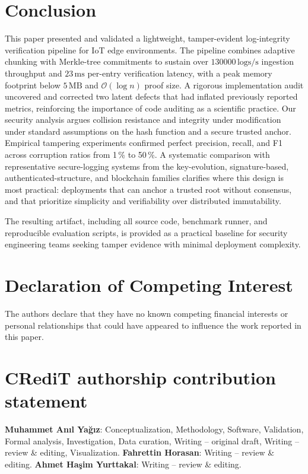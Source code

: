 \documentclass[preprint,12pt]{elsarticle}
\begin{document}
\section{Conclusion}
\label{sec:conclusion}

This paper presented and validated a lightweight, tamper-evident log-integrity verification pipeline for IoT edge environments.
The pipeline combines adaptive chunking with Merkle-tree commitments to sustain over $130000\,\mathrm{logs/s}$ ingestion throughput and $23\,\mathrm{ms}$ per-entry verification latency, with a peak memory footprint below $5\,\mathrm{MB}$ and $\mathcal{O}(\log n)$ proof size.
A rigorous implementation audit uncovered and corrected two latent defects that had inflated previously reported metrics, reinforcing the importance of code auditing as a scientific practice.
Our security analysis argues collision resistance and integrity under modification under standard assumptions on the hash function and a secure trusted anchor.
Empirical tampering experiments confirmed perfect precision, recall, and F1 across corruption ratios from 1\,\% to 50\,\%.
A systematic comparison with representative secure-logging systems from the key-evolution, signature-based, authenticated-structure, and blockchain families clarifies where this design is most practical: deployments that can anchor a trusted root without consensus, and that prioritize simplicity and verifiability over distributed immutability.

The resulting artifact, including all source code, benchmark runner, and reproducible evaluation scripts, is provided as a practical baseline for security engineering teams seeking tamper evidence with minimal deployment complexity.


\section*{Declaration of Competing Interest}
The authors declare that they have no known competing financial interests or personal relationships that could have appeared to influence the work reported in this paper.

\section*{CRediT authorship contribution statement}
\textbf{Muhammet An\i l Ya\u{g}\i z}: Conceptualization, Methodology, Software, Validation, Formal analysis, Investigation, Data curation, Writing -- original draft, Writing -- review \& editing, Visualization.
\textbf{Fahrettin Horasan}: Writing -- review \& editing.
\textbf{Ahmet Ha\c{s}im Yurttakal}: Writing -- review \& editing.
\end{document}
